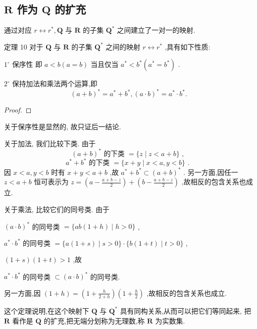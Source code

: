 \subsection{ \(\mathbf{R}\) 作为 \(\mathbf{Q}\) 的扩充}

通过对应 \(r \leftrightarrow  {r}^{ * },\mathbf{Q}\) 与 \(\mathbf{R}\) 的子集 \({\mathbf{Q}}^{ * }\) 之间建立了一对一的映射.

定理 10 对于 \(\mathbf{Q}\) 与 \(\mathbf{R}\) 的子集 \({\mathbf{Q}}^{ * }\) 之间的映射 \(r \leftrightarrow  {r}^{ * }\) ,具有如下性质:

\({1}^{ \circ  }\) 保序性 即 \(a < b\left( {a = b}\right)\) 当且仅当 \({a}^{ * } < {b}^{ * }\left( {{a}^{ * } = {b}^{ * }}\right)\) .

\({2}^{ \circ  }\) 保持加法和乘法两个运算,即
\[
{\left( a + b\right) }^{ * } = {a}^{ * } + {b}^{ * },{\left( a \cdot  b\right) }^{ * } = {a}^{ * } \cdot  {b}^{ * }.
\]
\begin{proof}

\end{proof}
关于保序性是显然的, 故只证后一结论.

关于加法, 我们比较下类. 由于
\[
{\left( a + b\right) }^{ * }\text{ 的下类 } = \{ z \mid  z < a + b\} \text{ , }
\]
\[
{a}^{ * } + {b}^{ * }\text{ 的下类 } = \{ x + y \mid  x < a,y < b\} \text{ . }
\]
因 \(x < a,y < b\) 时有 \(x + y < a + b\) ,故 \({a}^{ * } + {b}^{ * } \subset  {\left( a + b\right) }^{ * }\) . 另一方面,因任一 \(z < a + b\) 恒可表示为 \(z = \left( {a - \frac{a + b - z}{2}}\right)  + \left( {b - \frac{a + b - z}{2}}\right)\) ,故相反的包含关系也成立.

关于乘法, 比较它们的同号类. 由于

\({\left( a \cdot  b\right) }^{ * }\) 的同号类 \(= \{ {ab}\left( {1 + h}\right)  \mid  h > 0\}\) ,

\({a}^{ * } \cdot  {b}^{ * }\) 的同号类 \(= \{ a\left( {1 + s}\right)  \mid  s > 0\}  \cdot  \{ b\left( {1 + t}\right)  \mid  t > 0\}\) ,

\(\left( {1 + s}\right) \left( {1 + t}\right)  > 1\) ,故

\({a}^{ * } \cdot  {b}^{ * }\) 的同号类 \(\subset  {\left( a \cdot  b\right) }^{ * }\) 的同号类.

另一方面,因 \(\left( {1 + h}\right)  = \left( {1 + \frac{h}{2 + h}}\right) \left( {1 + \frac{h}{2}}\right)\) ,故相反的包含关系也成立.

这个定理说明,在这个映射下 \(\mathbf{Q}\) 与 \({\mathbf{Q}}^{ * }\) 具有同构关系,从而可以把它们等同起来, 把 \(\mathbf{R}\) 看作是 \(\mathbf{Q}\) 的扩充,把无端分划称为无理数,称 \(\mathbf{R}\) 为实数集.

